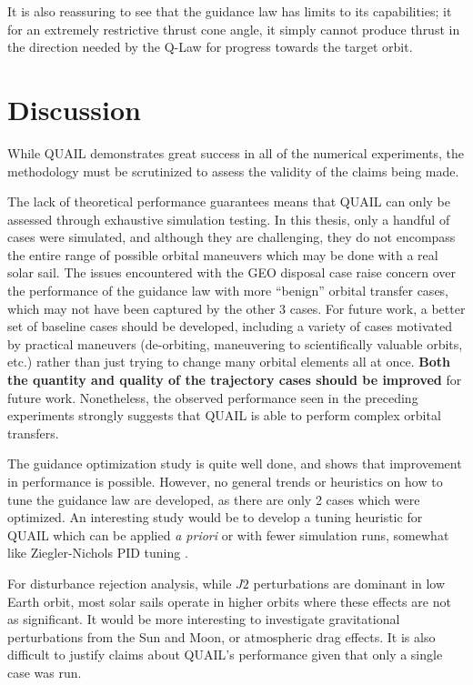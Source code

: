 It is also reassuring to see that the guidance law has limits to its capabilities; it for an extremely restrictive thrust cone angle, it simply cannot produce thrust in the direction needed by the Q-Law for progress towards the target orbit.

\section{Discussion}
While QUAIL demonstrates great success in all of the numerical experiments, the methodology must be scrutinized to assess the validity of the claims being made.

The lack of theoretical performance guarantees means that QUAIL can only be assessed through exhaustive simulation testing. In this thesis, only a handful of cases were simulated, and although they are challenging, they do not encompass the entire range of possible orbital maneuvers which may be done with a real solar sail. The issues encountered with the GEO disposal case raise concern over the performance of the guidance law with more ``benign'' orbital transfer cases, which may not have been captured by the other 3 cases. For future work, a better set of baseline cases should be developed, including a variety of cases motivated by practical maneuvers (de-orbiting, maneuvering to scientifically valuable orbits, etc.) rather than just trying to change many orbital elements all at once. \textbf{Both the quantity and quality of the trajectory cases should be improved} for future work. Nonetheless, the observed performance seen in the preceding experiments strongly suggests that QUAIL is able to perform complex orbital transfers.

The guidance optimization study is quite well done, and shows that improvement in performance is possible. However, no general trends or heuristics on how to tune the guidance law are developed, as there are only 2 cases which were optimized. An interesting study would be to develop a tuning heuristic for QUAIL which can be applied \textit{a priori} or with fewer simulation runs, somewhat like Ziegler-Nichols PID tuning \cite{ziegler1942optimum}.

For disturbance rejection analysis, while \(J2\) perturbations are dominant in low Earth orbit, most solar sails operate in higher orbits where these effects are not as significant. It would be more interesting to investigate gravitational perturbations from the Sun and Moon, or atmospheric drag effects. It is also difficult to justify claims about QUAIL's performance given that only a single case was run.

